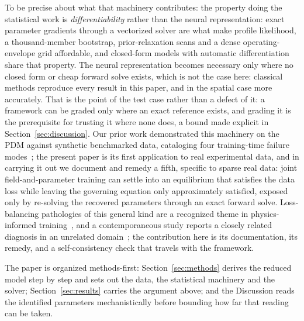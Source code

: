 \documentclass[pdflatex,sn-nature]{sn-jnl}
\begin{document}
To be precise about what that machinery contributes: the
property doing the statistical work is \emph{differentiability} rather
than the neural representation: exact parameter gradients through a
vectorized solver are what make profile likelihood, a thousand-member
bootstrap, prior-relaxation scans and a dense operating-envelope grid
affordable, and closed-form models with automatic differentiation share
that property. The neural representation becomes necessary only where no
closed form or cheap forward solve exists, which is not the case here:
classical methods reproduce every result in this paper, and in the
spatial case more accurately. That is the point of the test case rather
than a defect of it: a framework can be graded only where an exact
reference exists, and grading it is the prerequisite for trusting it
where none does, a bound made explicit in Section~\ref{sec:discussion}. Our
prior work demonstrated this machinery on the PDM against synthetic
benchmarked data, cataloging four training-time failure
modes~\citep{farooqi2025pinnpdm}; the present paper is its first
application to real experimental data, and in carrying it out we
document and remedy a fifth, specific to sparse real data: joint
field-and-parameter training can settle into an equilibrium that
satisfies the data loss while leaving the governing equation only
approximately satisfied, exposed only by re-solving the recovered
parameters through an exact forward solve. Loss-balancing pathologies of
this general kind are a recognized theme in physics-informed
training~\citep{wang2022ntk,krishnapriyan2021failure}, and a
contemporaneous study reports a closely related diagnosis in an
unrelated domain~\citep{pinnverse2025}; the contribution here is its
documentation, its remedy, and a self-consistency check that travels
with the framework.

The paper is organized methods-first: Section~\ref{sec:methods} derives
the reduced model step by step and sets out the data, the statistical
machinery and the solver; Section~\ref{sec:results} carries the argument
above; and the Discussion reads the identified parameters
mechanistically before bounding how far that reading can be taken.

\end{document}
